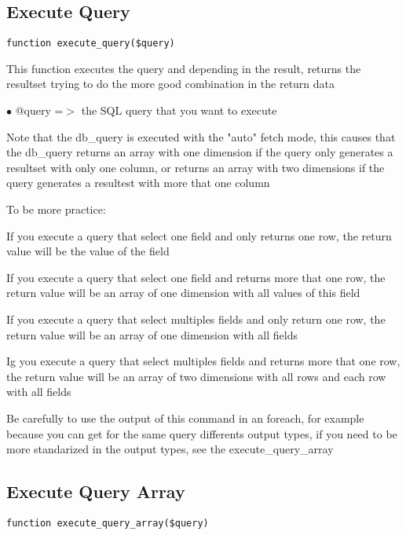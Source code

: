 \documentclass[a4paper]{book}
\begin{document}
\hypertarget{toc244}{}
\subsection{Execute Query}

\begin{lstlisting}
function execute_query($query)
\end{lstlisting}

This function executes the query and depending in the result, returns the
resultset trying to do the more good combination in the return data

\begin{compactitem}
\item[\color{myblue}$\bullet$] @query =$>$ the SQL query that you want to execute
\end{compactitem}

Note that the db\_query is executed with the "auto" fetch mode, this causes
that the db\_query returns an array with one dimension if the query only
generates a resultset with only one column, or returns an array with two
dimensions if the query generates a resultest with more that one column

To be more practice:

If you execute a query that select one field and only returns one row,
the return value will be the value of the field

If you execute a query that select one field and returns more that one
row, the return value will be an array of one dimension with all values
of this field

If you execute a query that select multiples fields and only return one
row, the return value will be an array of one dimension with all fields

Ig you execute a query that select multiples fields and returns more that
one row, the return value will be an array of two dimensions with all rows
and each row with all fields

Be carefully to use the output of this command in an foreach, for example
because you can get for the same query differents output types, if you
need to be more standarized in the output types, see the execute\_query\_array

\hypertarget{toc245}{}
\subsection{Execute Query Array}

\begin{lstlisting}
function execute_query_array($query)
\end{lstlisting}
\end{document}
